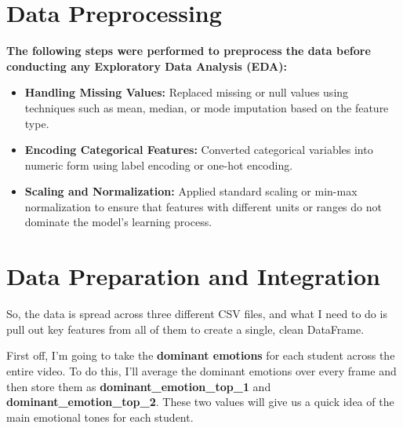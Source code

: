 \documentclass{article}
\newcommand{\highlight}[1]{\textsf{\textbf{#1}}}  %
\begin{document}
\section{Data Preprocessing}
\begin{tcolorbox}[colback=teal!5!white,colframe=teal!75!black,title= Steps for Data preprocessing]
\textbf{The following steps were performed to preprocess the data before conducting any Exploratory Data Analysis (EDA):}

\begin{itemize}
    \item \textbf{Handling Missing Values:} Replaced missing or null values using techniques such as mean, median, or mode imputation based on the feature type.
    \item \textbf{Encoding Categorical Features:} Converted categorical variables into numeric form using label encoding or one-hot encoding.
    \item \textbf{Scaling and Normalization:} Applied standard scaling or min-max normalization to ensure that features with different units or ranges do not dominate the model's learning process.
\end{itemize}
\end{tcolorbox}



\section{Data Preparation and Integration}

So, the data is spread across three different CSV files, and what I need to do is pull out key features from all of them to create a single, clean DataFrame.

\noindent\sffamily
First off, I’m going to take the \highlight{dominant emotions} for each student across the entire video. To do this, I’ll average the dominant emotions over every frame and then store them as \highlight{dominant\_emotion\_top\_1} and \highlight{dominant\_emotion\_top\_2}. These two values will give us a quick idea of the main emotional tones for each student.
\end{document}

